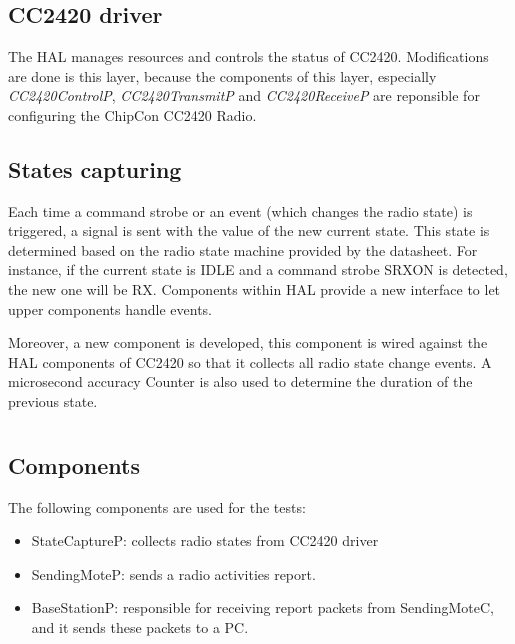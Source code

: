 \documentclass[a4paper,11pt]{article}
\begin{document}
\section{}

  \subsection{CC2420 driver}

The HAL manages resources and controls the status of CC2420. Modifications are done is this layer, because the components of this layer, especially \emph{CC2420ControlP}, \emph{CC2420TransmitP} and \emph{CC2420ReceiveP} are reponsible for configuring the ChipCon CC2420 Radio.

  \subsection{States capturing}

Each time a command strobe or an event (which changes the radio state) is triggered, a signal is sent with the value of the new current state. This state is determined based on the radio state machine provided by the datasheet. For instance, if the current state is IDLE and a command strobe SRXON is detected, the new one will be RX.
Components within HAL provide a new interface to let upper components handle events.

Moreover, a new component is developed, this component is wired against the HAL components of CC2420 so that it collects all radio state change events. A microsecond accuracy Counter is also used to determine the duration of the previous state.

\section{}

  \subsection{Components}

The following components are used for the tests:

  \begin{itemize}
    \item StateCaptureP: collects radio states from CC2420 driver
    \item SendingMoteP: sends a radio activities report.
    \item BaseStationP: responsible for receiving report packets from SendingMoteC, and it sends these packets to a PC.
  \end{itemize}
\end{document}

